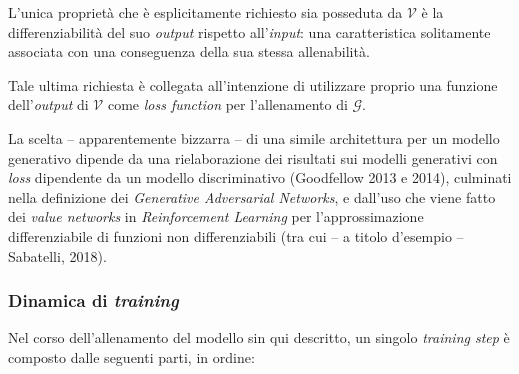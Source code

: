 \documentclass[a4paper, twoside]{article}
\begin{document}
L'unica proprietà che è esplicitamente richiesto sia posseduta da $\mathcal{V}$ è la differenziabilità del suo \textit{output} rispetto all'\textit{input}: una caratteristica solitamente associata con una conseguenza della sua stessa allenabilità.

Tale ultima richiesta è collegata all'intenzione di utilizzare proprio una funzione dell'\textit{output} di $\mathcal{V}$ come \textit{loss function} per l'allenamento di $\mathcal{G}$.

La scelta -- apparentemente bizzarra -- di una simile architettura per un modello generativo dipende da una rielaborazione dei risultati sui modelli generativi con \textit{loss} dipendente da un modello discriminativo (Goodfellow 2013 e 2014), culminati nella definizione dei \textit{Generative Adversarial Networks}, e dall'uso che viene fatto dei \textit{value networks} in \textit{Reinforcement Learning} per l'approssimazione differenziabile di funzioni non differenziabili (tra cui -- a titolo d'esempio -- Sabatelli, 2018).

\subsubsection{Dinamica di \textit{training}}

Nel corso dell'allenamento del modello sin qui descritto, un singolo \textit{training step} è composto dalle seguenti parti, in ordine:
\end{document}
